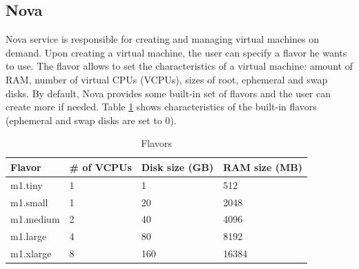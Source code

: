 \subsection{Nova}
Nova service is responsible for creating and managing virtual machines on demand.
Upon creating a virtual machine, the user can specify a flavor he wants to use.
The flavor allows to set the characteristics of a virtual machine: amount of RAM, number of virtual CPUs (VCPUs), sizes of root, ephemeral and swap disks.
By default, Nova provides some built-in set of flavors and the user can create more if needed.
Table \ref{table:flavors_list} shows characteristics of the built-in flavors (ephemeral and swap disks are set to 0).

\begin{table}[h]
	\centering
	\begin{tabular}{|l|l|l|l|}
		\hline
		\textbf{Flavor} & \textbf{\# of VCPUs} & \textbf{Disk size (GB)} & \textbf{RAM size (MB)}\\
		\hline
		m1.tiny & 1 & 1 & 512 \\
		m1.small & 1 & 20 & 2048 \\
		m1.medium & 2 & 40 & 4096 \\
		m1.large & 4 & 80 & 8192 \\
		m1.xlarge & 8 & 160 & 16384 \\
		\hline
	\end{tabular}
	\caption{Flavors}
	\label{table:flavors_list}
\end{table}


